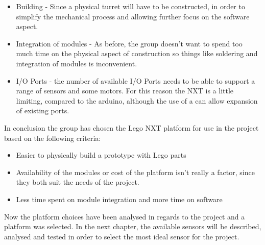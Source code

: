\begin{itemize}
  \item Building - Since a physical turret will have to be constructed, in
  order to simplify the mechanical process and allowing further focus on the
  software aspect.
  \item Integration of modules - As before, the group doesn't want to spend too
  much time on the physical aspect of construction so things like soldering and
  integration of modules is inconvenient.
  \item I/O Ports - the number of available I/O Ports needs to be able to
  support a range of sensors and some motors. For this reason the NXT is a
  little limiting, compared to the arduino, although the use of a
   can allow expansion of existing ports.
\end{itemize}

In conclusion the group has chosen the Lego NXT platform for use in the project
based on the following criteria:
\begin{itemize}
  \item Easier to physically build a prototype with Lego parts
  \item Availability of the modules or cost of the platform isn't really a
  factor, since they both suit the needs of the project.
  \item Less time spent on module integration and more time on software
\end{itemize}

Now the platform choices have been analysed in regards to the project and a
platform was selected. In the next chapter, the available sensors will be
described, analysed and tested in order to select the most ideal sensor for the
project.
